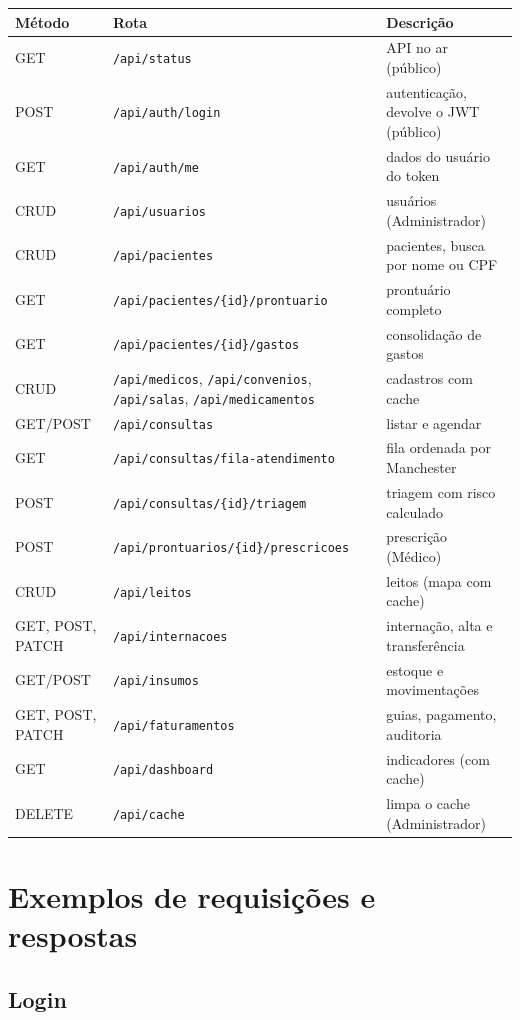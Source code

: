 \documentclass[12pt,a4paper]{article}
\newcommand{\cod}[1]{\texttt{#1}}
\begin{document}
\begin{longtable}{@{}p{2.5cm}p{8.2cm}p{4.4cm}@{}}
\toprule
\textbf{Método} & \textbf{Rota} & \textbf{Descrição} \\
\midrule
\endhead
GET  & \cod{/api/status} & API no ar (público) \\
POST & \cod{/api/auth/login} & autenticação, devolve o JWT (público) \\
GET  & \cod{/api/auth/me} & dados do usuário do token \\
CRUD & \cod{/api/usuarios} & usuários (Administrador) \\
CRUD & \cod{/api/pacientes} & pacientes, busca por nome ou CPF \\
GET  & \cod{/api/pacientes/\{id\}/prontuario} & prontuário completo \\
GET  & \cod{/api/pacientes/\{id\}/gastos} & consolidação de gastos \\
CRUD & \cod{/api/medicos}, \cod{/api/convenios}, \cod{/api/salas}, \cod{/api/medicamentos} & cadastros com cache \\
GET/POST & \cod{/api/consultas} & listar e agendar \\
GET  & \cod{/api/consultas/fila-atendimento} & fila ordenada por Manchester \\
POST & \cod{/api/consultas/\{id\}/triagem} & triagem com risco calculado \\
POST & \cod{/api/prontuarios/\{id\}/prescricoes} & prescrição (Médico) \\
CRUD & \cod{/api/leitos} & leitos (mapa com cache) \\
GET, POST, PATCH & \cod{/api/internacoes} & internação, alta e transferência \\
GET/POST & \cod{/api/insumos} & estoque e movimentações \\
GET, POST, PATCH & \cod{/api/faturamentos} & guias, pagamento, auditoria \\
GET  & \cod{/api/dashboard} & indicadores (com cache) \\
DELETE & \cod{/api/cache} & limpa o cache (Administrador) \\
\bottomrule
\end{longtable}

\section{Exemplos de requisições e respostas}

\subsection{Login}
\end{document}

